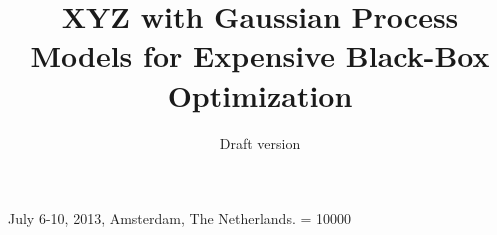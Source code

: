 \documentclass{sig-alternate}
\begin{document}
%
 {July 6-10, 2013, Amsterdam, The Netherlands.}
\widowpenalty = 10000


\title{XYZ with Gaussian Process Models for Expensive Black-Box Optimization}
\subtitle{Draft version
}
%
%
%
%
%
\end{document}
